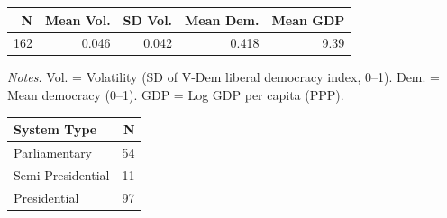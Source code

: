 \begin{table}[!htbp]
\begin{minipage}{.5\linewidth}
\centering
{}

\begin{tabular}{rrrrr}
\toprule
N & Mean Vol. & SD Vol. & Mean Dem. & Mean GDP\\
\midrule
162 & 0.046 & 0.042 & 0.418 & 9.39\\
\bottomrule
\end{tabular}
\vspace{1mm}\par\scriptsize\textit{Notes.} Vol. = Volatility (SD of V-Dem liberal democracy index, 0--1). Dem. = Mean democracy (0--1). GDP = Log GDP per capita (PPP).
\end{minipage}%
\begin{minipage}{.5\linewidth}
\centering
{}

\begin{tabular}{lr}
\toprule
System Type & N\\
\midrule
Parliamentary & 54\\
Semi-Presidential & 11\\
Presidential & 97\\
\bottomrule
\end{tabular}
\end{minipage}
\end{table}
